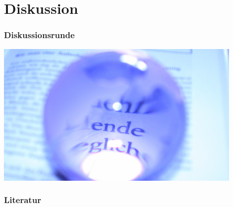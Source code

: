 \documentclass{beamer}
\begin{document}
%
%


\section{Diskussion}
\begin{frame}
\frametitle{Diskussionsrunde}
\begin{center}
\includegraphics[width=0.9\textwidth]{images/Ende}
\end{center}
\end{frame}

\begin{frame}[allowframebreaks]
        \frametitle{Literatur}
        
        
\end{frame}
\end{document}
